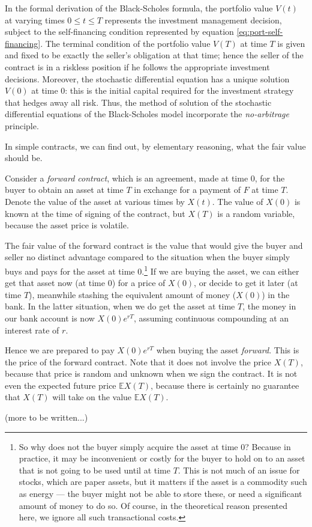\documentclass[12pt]{article}
\newcommand{\E}{\mathbb{E}}
\begin{document}
In the formal derivation of the Black-Scholes formula,
the portfolio value $V(t)$ at varying times $0 \leq t \leq T$
represents the investment management decision,
subject to the self-financing condition represented by
equation \eqref{eq:port-self-financing}.
The terminal condition 
of the portfolio value $V(T)$ at time $T$ is given and fixed
to be exactly the seller's obligation at that time; hence the seller
of the contract is in a riskless position if he follows the appropriate
investment decisions.
Moreover, the stochastic differential equation 
has a unique solution $V(0)$ at time $0$: this is the initial capital required
for the investment strategy that hedges away all risk.
Thus, the method of solution of the stochastic differential equations
of the Black-Scholes model incorporate the \emph{no-arbitrage} principle.

\medskip

In simple contracts, we can find out, by elementary reasoning,
what the fair value should be.  

Consider a \emph{forward contract},
which is an agreement, made at time $0$, for the buyer to obtain an asset
at time $T$ in exchange for a payment of $F$ at time $T$.
Denote the value of the asset at various times by $X(t)$.  The value
of $X(0)$ is known at the time of signing of the contract, 
but $X(T)$ is a random variable, because the asset price
is volatile.

The fair value of the forward contract
is the value that would give the buyer and seller no distinct
advantage compared to the situation when the buyer
simply buys and pays for the asset at time $0$.\footnote{So why does not the buyer simply acquire the asset at time $0$?  Because in practice, it may be inconvenient 
or costly for the buyer to hold on to an asset that is not going to be used
until at time $T$.  This is not much of an issue for stocks, which are paper 
assets, but it matters if the asset is a commodity such as energy --- 
the buyer might not be able to store these, or need a significant
amount of money to do so.  Of course, in the theoretical reason presented here,
we ignore all such transactional costs.}
If we are buying the asset, we can either get that asset now (at time $0$) 
for a price of $X(0)$, or decide to get it later (at time $T$),
meanwhile stashing the equivalent amount of money ($X(0)$)
in the bank.  In the latter situation, when we do get the asset at time $T$,
the money in our bank account is now $X(0) e^{rT}$, assuming
continuous compounding at an interest rate of $r$.   

Hence we are prepared to pay $X(0)e^{rT}$ when buying the asset \emph{forward}.
This is the price of the forward contract.
Note that it does not involve the price $X(T)$, because that price
is random and unknown when we sign the contract.  It is not even
the expected future price $\E{X(T)}$, because there is certainly
no guarantee that $X(T)$ will take on the value $\E{X(T)}$.

(more to be written...)

\end{document}
